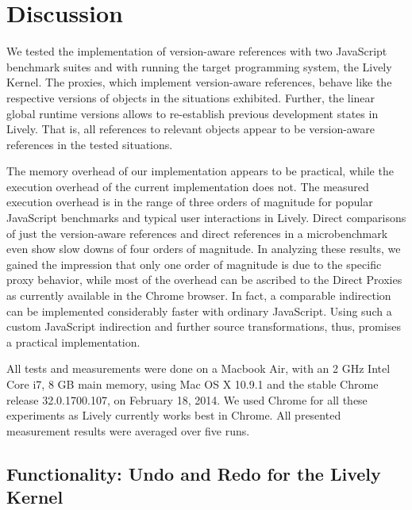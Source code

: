 \chapter{Discussion} \label{chapter:DISCUSSION}

We tested the implementation of version-aware references with two JavaScript benchmark suites and with running the target programming system, the Lively Kernel.
The proxies, which implement version-aware references, behave like the respective versions of objects in the situations exhibited.
Further, the linear global runtime versions allows to re-establish previous development states in Lively.
That is, all references to relevant objects appear to be version-aware references in the tested situations.

The memory overhead of our implementation appears to be practical, while the execution overhead of the current implementation does not.
The measured execution overhead is in the range of three orders of magnitude for popular JavaScript benchmarks and typical user interactions in Lively.
Direct comparisons of just the version-aware references and direct references in a microbenchmark even show slow downs of four orders of magnitude.
In analyzing these results, we gained the impression that only one order of magnitude is due to the specific proxy behavior, while most of the overhead can be ascribed to the Direct Proxies as currently available in the Chrome browser.
In fact, a comparable indirection can be implemented considerably faster with ordinary JavaScript.
Using such a custom JavaScript indirection and further source transformations, thus, promises a practical implementation.

All tests and measurements were done on a Macbook Air, with an 2 GHz Intel Core i7, 8 GB main memory, using Mac OS X 10.9.1 and the stable Chrome release 32.0.1700.107, on February 18, 2014.
We used Chrome for all these experiments as Lively currently works best in Chrome.
All presented measurement results were averaged over five runs.


\section{Functionality: Undo and Redo for the Lively Kernel}



